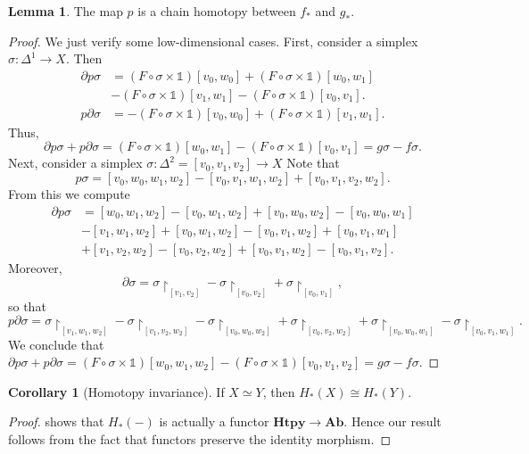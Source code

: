 \documentclass[10pt,letterpaper,cm]{nupset}
\theoremstyle{definition}
\theoremstyle{theorem}
\newtheorem{lemma}[definition]{Lemma}
\newtheorem{corollary}[definition]{Corollary}
\theoremstyle{remark}
\newcommand{\1}{\mathbb{1}}
\newcommand{\0}{\vec 0}
\begin{document}
\begin{lemma}\label{l1}
The map $p$ is a chain homotopy between $f_{\ast}$ and $g_{\ast}$. 
\end{lemma}
\begin{proof}
We just verify some low-dimensional cases. First, consider a simplex $\sigma : \Delta^1 \to X$.  Then 
\begin{align*} \partial p \sigma & = (F \circ \sigma \times \1)[v_0,w_0]  + (F \circ \sigma \times \1)[w_0, w_1] 
\\ & - (F \circ \sigma \times \1)[v_1, w_1] - (F \circ \sigma \times \1)[v_0, v_1].
\\ p \partial \sigma & = {- (F \circ \sigma \times \1)[v_0, w_0]} + (F \circ \sigma \times \1)[v_1, w_1]. 
\end{align*}
Thus, 
\[
\partial p \sigma + p \partial \sigma = (F \circ \sigma \times \1)[w_0, w_1] - (F \circ \sigma \times \1)[v_0, v_1]= g\sigma - f \sigma.
\] Next, consider a simplex $\sigma : \Delta^2 = [v_0, v_1, v_2] \to X$ Note that
\[
p\sigma = [v_0, w_0, w_1, w_2] - [v_0,v_1, w_1, w_2] + [v_0, v_1, v_2, w_2].
\] From this we compute
\begin{align*}  \partial p \sigma  & = [w_0, w_1, w_2] - [v_0, w_1, w_2] + [v_0, w_0, w_2] - [v_0, w_0, w_1]
\\ & -[v_1, w_1, w_2] +[v_0, w_1, w_2] - [v_0, v_1, w_2] +[v_0, v_1, w_1] 
\\ & + [v_1, v_2, w_2]- [v_0, v_2, w_2] + [v_0, v_1, w_2]- [v_0, v_1, v_2].
\end{align*} 
Moreover,
\[
\partial \sigma = \sigma \restriction_{[v_1, v_2]} -  \sigma \restriction_{[v_0, v_2]} +  \sigma \restriction_{[v_0, v_1]},
\] so that
\[
p \partial \sigma = \sigma \restriction_{[v_1, w_1, w_2]} - \sigma \restriction_{[ v_1, v_2, w_2]} -  \sigma \restriction_{[ v_0, w_0, w_2]} 
+  \sigma \restriction_{[v_0, v_2, w_2 ]} +  \sigma \restriction_{[ v_0, w_0, w_1]} -  \sigma \restriction_{[ v_0, v_1, w_1]}.
\] We conclude that $\partial p \sigma + p \partial \sigma = (F \circ \sigma \times \1)[w_0, w_1, w_2] - (F \circ \sigma \times \1)[v_0, v_1, v_2] = g \sigma - f \sigma$.
\end{proof}


\begin{corollary}[Homotopy invariance]
If $X \simeq Y$, then $H_{\ast}(X) \cong H_{\ast}(Y)$.
\end{corollary}
\begin{proof}
 shows that $H_{\ast}(-)$ is actually a functor $\mathbf{Htpy} \to  \mathbf{Ab}$. Hence our result follows from the fact that functors preserve the identity morphism. 
\end{proof}
\end{document}
